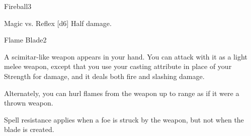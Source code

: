 \begin{spellsection}{Fireball}{3}
    \begin{spellheader}
    \end{spellheader}
    \begin{spellcontent}
        \begin{spelltargetinginfo}
        \end{spelltargetinginfo}
        \begin{spelleffects}
            \begin{spellattack}{Magic vs. Reflex}
                \spellsuccess {}[d6]
                \spellfailure Half damage.
            \end{spellattack}
        \end{spelleffects}
    \end{spellcontent}
    \begin{spellfooter}
        \spellnotes \destructivespellnotes

        \firespellnotes
        \miscastyou
    \end{spellfooter}
\end{spellsection}

\begin{spellsection}{Flame Blade}{2}
    \begin{spellheader}
    \end{spellheader}
    \begin{spellcontent}
        \begin{spelleffects}
            \spelleffect A scimitar-like weapon appears in your hand. You can attack with it as a light melee weapon, except that you use your casting attribute in place of your Strength for damage, and it deals both fire and slashing damage.

            Alternately, you can hurl flames from the weapon up to \rngmed range as if it were a thrown weapon.

            \spelldur \durmed \dismissable
        \end{spelleffects}
    \end{spellcontent}
    \begin{spellfooter}
        \spellnotes Spell resistance applies when a foe is struck by the weapon, but not when the blade is created.
        \firespellnotes
        \miscastexplode
    \end{spellfooter}
\end{spellsection}

